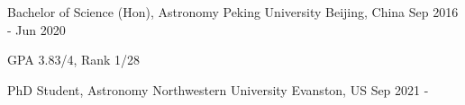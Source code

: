 


\begin{cventries}


\cventry
{{Bachelor of Science (Hon)}, Astronomy} %
{Peking University} %
{Beijing, China} %
{Sep 2016 - Jun 2020} %
{ %
	\begin{cvitems}
		\item {GPA 3.83/4, Rank 1/28}
	\end{cvitems}
}

\cventry
{{PhD Student}, Astronomy} %
{Northwestern University} %
{Evanston, US} %
{Sep 2021 - } %
{ %
}




\end{cventries}